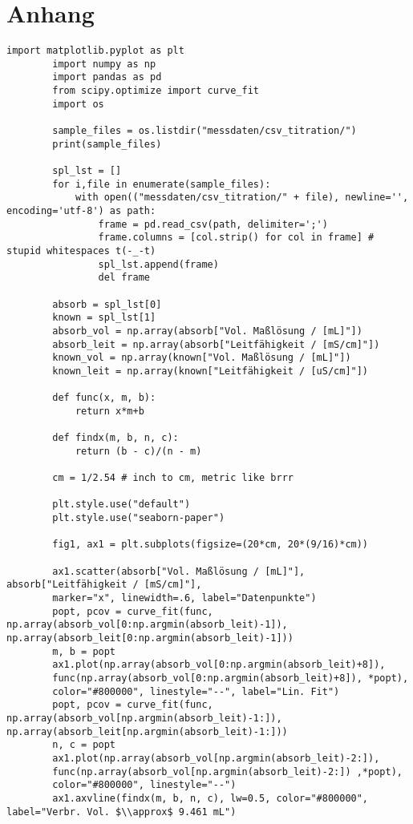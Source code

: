 \chapter{Anhang}
	\begin{lstlisting}[style=python, caption={Zur Auswertung der konduktometrischen Titration verwendeter Python-Code.}]
		import matplotlib.pyplot as plt
		import numpy as np
		import pandas as pd
		from scipy.optimize import curve_fit
		import os

		sample_files = os.listdir("messdaten/csv_titration/")
		print(sample_files)

		spl_lst = []
		for i,file in enumerate(sample_files):
			with open(("messdaten/csv_titration/" + file), newline='', encoding='utf-8') as path:
				frame = pd.read_csv(path, delimiter=';')
				frame.columns = [col.strip() for col in frame] # stupid whitespaces t(-_-t)
				spl_lst.append(frame)
				del frame

		absorb = spl_lst[0]
		known = spl_lst[1]
		absorb_vol = np.array(absorb["Vol. Maßlösung / [mL]"])
		absorb_leit = np.array(absorb["Leitfähigkeit / [mS/cm]"])
		known_vol = np.array(known["Vol. Maßlösung / [mL]"])
		known_leit = np.array(known["Leitfähigkeit / [uS/cm]"])

		def func(x, m, b):
			return x*m+b

		def findx(m, b, n, c):
			return (b - c)/(n - m)

		cm = 1/2.54 # inch to cm, metric like brrr

		plt.style.use("default")
		plt.style.use("seaborn-paper")

		fig1, ax1 = plt.subplots(figsize=(20*cm, 20*(9/16)*cm))

		ax1.scatter(absorb["Vol. Maßlösung / [mL]"], absorb["Leitfähigkeit / [mS/cm]"],
		marker="x", linewidth=.6, label="Datenpunkte")
		popt, pcov = curve_fit(func, np.array(absorb_vol[0:np.argmin(absorb_leit)-1]), np.array(absorb_leit[0:np.argmin(absorb_leit)-1]))
		m, b = popt
		ax1.plot(np.array(absorb_vol[0:np.argmin(absorb_leit)+8]),
		func(np.array(absorb_vol[0:np.argmin(absorb_leit)+8]), *popt),
		color="#800000", linestyle="--", label="Lin. Fit")
		popt, pcov = curve_fit(func, np.array(absorb_vol[np.argmin(absorb_leit)-1:]), np.array(absorb_leit[np.argmin(absorb_leit)-1:]))
		n, c = popt
		ax1.plot(np.array(absorb_vol[np.argmin(absorb_leit)-2:]),
		func(np.array(absorb_vol[np.argmin(absorb_leit)-2:]) ,*popt),
		color="#800000", linestyle="--")
		ax1.axvline(findx(m, b, n, c), lw=0.5, color="#800000", label="Verbr. Vol. $\\approx$ 9.461 mL")


\end{lstlisting}
